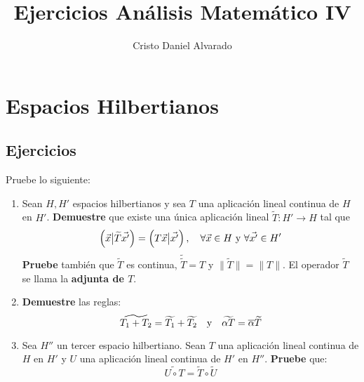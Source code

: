 \documentclass[12pt]{report}
\newcounter{it}
\theoremstyle{largebreak}
\newcommand\cf[3]{\ensuremath{#1:#2\rightarrow#3}}
\newcommand\adj[1]{\ensuremath{\widetilde{#1}}}
\newcommand\pint[2]{\ensuremath{\left(#1\big|#2\right)}}
\newcommand\conj[1]{\ensuremath{\overline{#1}}}
\newcommand\norm[1]{\ensuremath{\|#1\|}}
\begin{document}
    \title{Ejercicios Análisis Matemático IV}
    \author{Cristo Daniel Alvarado}
    \maketitle

    \tableofcontents %

    \chapter{Espacios Hilbertianos}

    \section{Ejercicios}

    \renewcommand{\theenumi}{\roman{enumi}}

    \begin{excer}
        Pruebe lo siguiente:
        \begin{enumerate}
            \item Sean $H,H'$ espacios hilbertianos y sea $T$ una aplicación lineal continua de $H$ en $H'$. \textbf{Demuestre} que existe una única aplicación lineal $\cf{\adj{T}}{H'}{H}$ tal que
            \begin{equation*}
                \pint{\vec{x}}{\adj{T}\vec{x'}}=\pint{T\vec{x}}{\vec{x'}},\quad\forall\vec{x}\in H\textup{ y }\forall\vec{x'}\in H'
            \end{equation*}
            \textbf{Pruebe} también que $\adj{T}$ es continua, $\adj{\adj{T}}=T$ y $\norm{\adj{T}}=\norm{T}$. El operador $\adj{T}$ se llama la \textbf{adjunta de $T$}.
            \item \textbf{Demuestre} las reglas:
            \begin{equation*}
                \adj{T_1+T_2}=\adj{T_1}+\adj{T_2}\quad\textup{y}\quad\adj{\alpha T}=\conj{\alpha}\adj{T}
            \end{equation*}
            \item Sea $H''$ un tercer espacio hilbertiano. Sean $T$ una aplicación lineal continua de $H$ en $H'$ y $U$ una aplicación lineal continua de $H'$ en $H''$. \textbf{Pruebe} que:
            \begin{equation*}
                \adj{U\circ T}=\adj{T}\circ\adj{U}
            \end{equation*}
        \end{enumerate}
    \end{excer}
\end{document}
